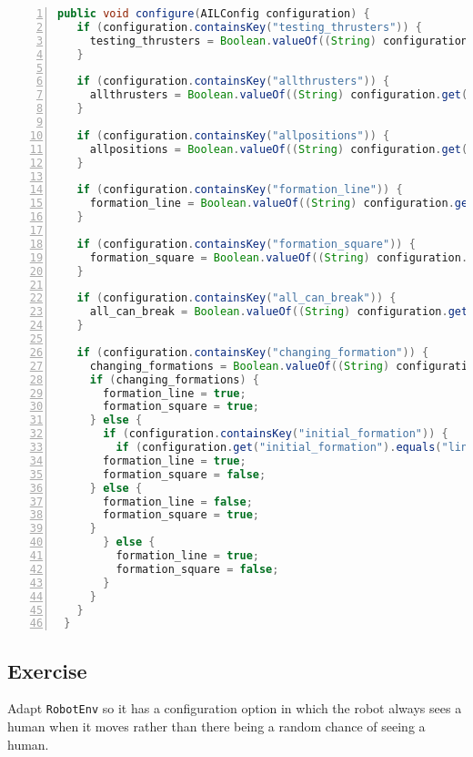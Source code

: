 \documentclass[a4]{article}
\begin{document}
\begin{lstlisting}[float,caption=Sample Configure Method,basicstyle=\sffamily,language=Java,style=easslisting,label=code:config,numbers=left]
 public void configure(AILConfig configuration) {
   if (configuration.containsKey("testing_thrusters")) {
     testing_thrusters = Boolean.valueOf((String) configuration.get("testing_thrusters"));
   }

   if (configuration.containsKey("allthrusters")) {
     allthrusters = Boolean.valueOf((String) configuration.get("allthrusters"));
   }

   if (configuration.containsKey("allpositions")) {
     allpositions = Boolean.valueOf((String) configuration.get("allpositions");
   }

   if (configuration.containsKey("formation_line")) {
     formation_line = Boolean.valueOf((String) configuration.get("formation_line"));
   }

   if (configuration.containsKey("formation_square")) {
     formation_square = Boolean.valueOf((String) configuration.get("formation_square");
   }

   if (configuration.containsKey("all_can_break")) {
     all_can_break = Boolean.valueOf((String) configuration.get("all_can_break"));
   }

   if (configuration.containsKey("changing_formation")) {
     changing_formations = Boolean.valueOf((String) configuration.get("changing_formations"));
     if (changing_formations) {
       formation_line = true;
       formation_square = true;
     } else {
       if (configuration.containsKey("initial_formation")) {
         if (configuration.get("initial_formation").equals("line")) {
 	   formation_line = true;
	   formation_square = false;
	 } else {
	   formation_line = false;
	   formation_square = true;
	 }
       } else {
         formation_line = true;
         formation_square = false;
       }
     }
   }
 }
\end{lstlisting}

\subsection{Exercise}
Adapt \texttt{RobotEnv} so it has a configuration option in which the robot always sees a human when it moves rather than there being a random chance of seeing a human.


\end{document}
